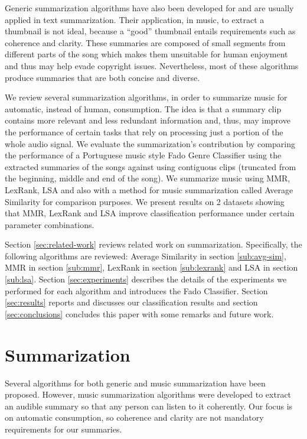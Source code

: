 \documentclass[11pt,onecolumn,draftcls]{IEEEtran}
\begin{document}
Generic summarization algorithms have also been developed for and are usually
applied in text summarization. Their application, in music, to extract a
thumbnail is not ideal, because a ``good'' thumbnail entails requirements such
as coherence and clarity. These summaries are composed of small segments from
different parts of the song which makes them unsuitable for human enjoyment and
thus may help evade copyright issues. Nevertheless, most of these algorithms
produce summaries that are both concise and diverse.

We review several summarization algorithms, in order to summarize music for
automatic, instead of human, consumption. The idea is that a summary clip
contains more relevant and less redundant information and, thus, may improve the
performance of certain tasks that rely on processing just a portion of the whole
audio signal. We evaluate the summarization's contribution by comparing the
performance of a Portuguese music style Fado Genre Classifier\cite{Girao2014}
using the extracted summaries of the songs against using contiguous clips (truncated from
the beginning, middle and end of the song). We summarize music using \ac{MMR},
LexRank, \ac{LSA} and also with a method for music summarization called Average
Similarity for comparison purposes. We present results on 2 datasets showing
that \ac{MMR}, LexRank and \ac{LSA} improve classification performance under
certain parameter combinations.

Section \ref{sec:related-work} reviews related work on summarization.
Specifically, the following algorithms are reviewed: Average Similarity in
section \ref{sub:avg-sim}, \ac{MMR} in section \ref{sub:mmr}, LexRank in section
\ref{sub:lexrank} and \ac{LSA} in section \ref{sub:lsa}. Section
\ref{sec:experiments} describes the details of the experiments we performed for
each algorithm and introduces the Fado Classifier. Section \ref{sec:results}
reports and discusses our classification results and section
\ref{sec:conclusions} concludes this paper with some remarks and future work.

\section{Summarization\label{sec:related-work}}
Several algorithms for both generic and music summarization have been proposed.
However, music summarization algorithms were developed to extract an audible
summary so that any person can listen to it coherently. Our focus is on
automatic consumption, so coherence and clarity are not mandatory requirements
for our summaries.
\end{document}
